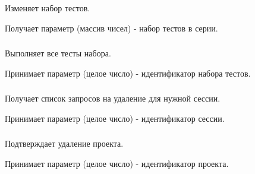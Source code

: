 Изменяет набор тестов.

Получает параметр  (массив чисел) - набор тестов в серии.

\subsubsection{}

Выполняет все тесты набора.

Принимает параметр  (целое число) - идентификатор набора тестов.

\subsubsection{}

Получает список запросов на удаление для нужной сессии.

Принимает параметр  (целое число) - идентификатор сессии.

\subsubsection{}

Подтверждает удаление проекта.

Принимает параметр  (целое число) - идентификатор проекта.
